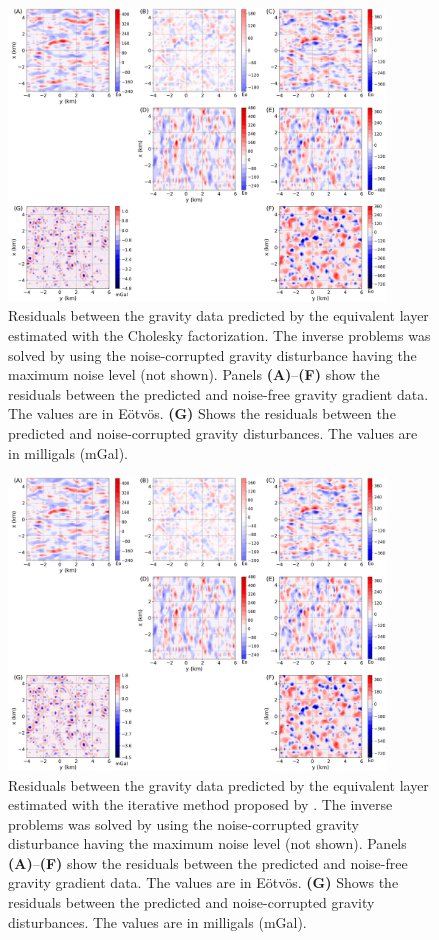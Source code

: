 \documentclass[utf8]{frontiers_suppmat} %
\begin{document}
\begin{figure}[htbp]
	\begin{center}
		\includegraphics[width=10cm]{Fig/Cholesky_residuals}
	\end{center}
	\caption{
		Residuals between the gravity data predicted by the equivalent layer estimated with 
		the Cholesky factorization.
		The inverse problems was solved by using the noise-corrupted gravity 
		disturbance having the maximum noise level (not shown).
		Panels \textbf{(A)}--\textbf{(F)} show the residuals between the predicted and 
		noise-free gravity gradient data. The values are in Eötvös.
		\textbf{(G)} Shows the residuals between the predicted and noise-corrupted gravity 
		disturbances. The values are in milligals (mGal).
	}
	\label{fig:residuals-Cholesky}
\end{figure}

\begin{figure}[htbp]
	\begin{center}
		\includegraphics[width=10cm]{Fig/SOB17_residuals}
	\end{center}
	\caption{
		Residuals between the gravity data predicted by the equivalent layer estimated with 
		the iterative method proposed by \citet{siqueira-etal2017}.
		The inverse problems was solved by using the noise-corrupted gravity 
		disturbance having the maximum noise level (not shown).
		Panels \textbf{(A)}--\textbf{(F)} show the residuals between the predicted and 
		noise-free gravity gradient data. The values are in Eötvös.
		\textbf{(G)} Shows the residuals between the predicted and noise-corrupted gravity 
		disturbances. The values are in milligals (mGal).
	}
	\label{fig:residuals-SOB17}
\end{figure}
\end{document}
